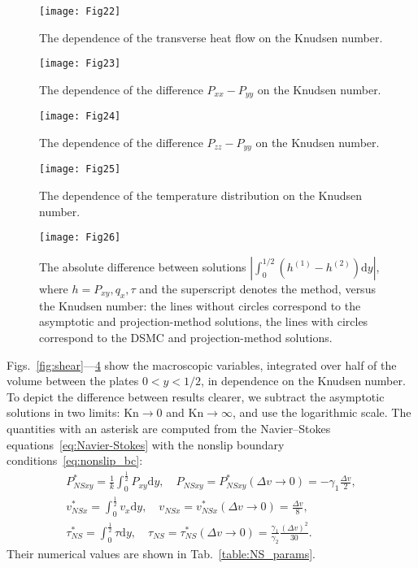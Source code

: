 \documentclass[review]{elsarticle}
\newcommand{\Kn}{\mathrm{Kn}}
\newcommand{\NS}{N\!S}
\newcommand{\dd}{\mathrm{d}}
\begin{document}
\begin{figure}
    \centering
    \texttt{[image: Fig22]}
    \caption{The dependence of the transverse heat flow on the Knudsen number.}
    \label{fig:qflowy}
\end{figure}

\begin{figure}
    \centering
    \texttt{[image: Fig23]}
    \caption{The dependence of the difference \(P_{xx}-P_{yy}\) on the Knudsen number.}
    \label{fig:pxx}
\end{figure}

\begin{figure}
    \centering
    \texttt{[image: Fig24]}
    \caption{The dependence of the difference \(P_{zz}-P_{yy}\) on the Knudsen number.}
    \label{fig:pzz}
\end{figure}

\begin{figure}
    \centering
    \texttt{[image: Fig25]}
    \caption{The dependence of the temperature distribution on the Knudsen number.}
    \label{fig:temp}
\end{figure}

\begin{figure}
    \centering
    \texttt{[image: Fig26]}
    \caption{The absolute difference between solutions \(|\int_0^{1/2} (h^{(1)}-h^{(2)})\dd{y}|\),
        where \(h = P_{xy}, q_x, \tau\) and the superscript denotes the method, versus the Knudsen number:
        the lines without circles correspond to the asymptotic and projection-method solutions,
        the lines with circles correspond to the DSMC and projection-method solutions.}
    \label{fig:diff}
\end{figure}

Figs.~\ref{fig:shear}---\ref{fig:temp} show the macroscopic variables,
integrated over half of the volume between the plates \(0<y<1/2\), in dependence on the Knudsen number.
To depict the difference between results clearer,
we subtract the asymptotic solutions in two limits: \(\Kn\to0\) and \(\Kn\to\infty\),
and use the logarithmic scale.
The quantities with an asterisk are computed from the Navier--Stokes equations~\eqref{eq:Navier-Stokes}
with the nonslip boundary conditions~\eqref{eq:nonslip_bc}:
\begin{gather*}
    P_{\NS xy}^* = \frac1k \int_0^\frac12 P_{xy} \dd{y}, \quad P_{\NS xy} = P_{\NS xy}^*(\Delta{v}\to0) = -\gamma_1\frac{\Delta{v}}2, \\
    v_{\NS x}^* = \int_0^\frac12 v_x \dd{y}, \quad v_{\NS x} = v_{\NS x}^*(\Delta{v}\to0) = \frac{\Delta{v}}8, \\
    \tau_{\NS}^* = \int_0^\frac12 \tau \dd{y}, \quad
        \tau_{\NS} = \tau_{\NS}^*(\Delta{v}\to0) = \frac{\gamma_1}{\gamma_2}\frac{(\Delta{v})^2}{30}.
\end{gather*}
Their numerical values are shown in Tab.~\ref{table:NS_params}.
\end{document}
